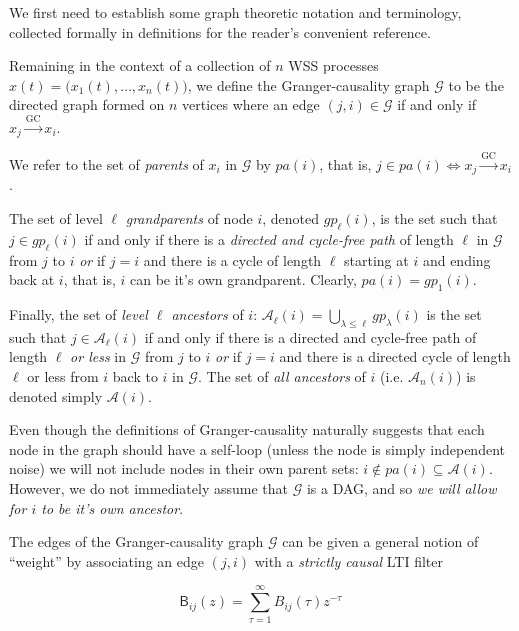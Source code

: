 \documentclass[12pt]{article}
\def\gc{\overset{\text{GC}}{\rightarrow}}  %
\def\gcg{\mathcal{G}}  %
\def\B{\mathsf{B}}  %
\newcommand{\pa}[1]{pa(#1)}  %
\newcommand{\anc}[1]{\mathcal{A}(#1)}  %
\newcommand{\ancn}[2]{\mathcal{A}_{#1}(#2)}  %
\newcommand{\gpn}[2]{gp_{#1}(#2)}  %
\begin{document}
We first need to establish some graph theoretic notation and
terminology, collected formally in definitions for the reader's
convenient reference.

\begin{definition}

Remaining in the context of a collection of $n$ WSS processes
$x(t) = \big(x_1(t), \ldots, x_n(t)\big)$, we define the Granger-causality
graph $\gcg$ to be the directed graph formed on $n$ vertices where an
edge $(j, i) \in \gcg$ if and only if $x_j \gc x_i$.

We refer to the set of \textit{parents} of $x_i$ in $\gcg$ by
$\pa{i}$, that is, $j \in \pa{i} \iff x_j \gc x_i$.
\end{definition}

\begin{definition}
The set of level $\ell$ \textit{grandparents} of node $i$, denoted
$\gpn{\ell}{i}$, is the set such that $j \in \gpn{\ell}{i}$ if and only if
there is a \textit{directed and cycle-free path} of length $\ell$ in
$\gcg$ from $j$ to $i$ \textit{or} if $j = i$ and there is a cycle of
length $\ell$ starting at $i$ and ending back at $i$, that is, $i$ can be
it's own grandparent.  Clearly, $\pa{i} = \gpn{1}{i}$.

Finally, the set of \textit{level $\ell$ ancestors} of
$i$: $\ancn{\ell}{i} = \bigcup_{\lambda \le \ell}\gpn{\lambda}{i}$ is the set such that
$j \in \ancn{\ell}{i}$ if and only if there is a directed and cycle-free
path of length $\ell$ \textit{or less} in $\gcg$ from $j$ to $i$
\textit{or} if $j = i$ and there is a directed cycle of length $\ell$ or
less from $i$ back to $i$ in $\gcg$.  The set of \textit{all
  ancestors} of $i$ (i.e. $\ancn{n}{i}$) is denoted simply $\anc{i}$.
\end{definition}

Even though the definitions of Granger-causality naturally suggests
that each node in the graph should have a self-loop (unless the node
is simply independent noise) we will not include nodes in their own
parent sets: $i \not\in \pa{i} \subseteq \anc{i}$.  However, we do not
immediately assume that $\gcg$ is a DAG, and so \textit{we will allow for $i$
to be it's own ancestor}.

The edges of the Granger-causality graph $\gcg$ can be given a general
notion of ``weight'' by associating an edge $(j, i)$ with a
\textit{strictly causal} LTI filter

\begin{equation}
  \label{eqn:filter}
  \B_{ij}(z) = \sum_{\tau = 1}^{\infty} B_{ij}(\tau)z^{-\tau}
\end{equation}
\end{document}
